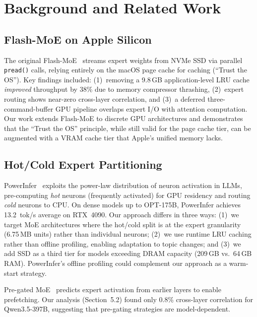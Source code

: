 \documentclass[11pt]{article}
\begin{document}
\section{Background and Related Work}

\subsection{Flash-MoE on Apple Silicon}

The original Flash-MoE~\cite{flashmoe} streams expert weights from NVMe SSD via parallel \texttt{pread()} calls, relying entirely on the macOS page cache for caching (``Trust the OS''). Key findings included: (1)~removing a 9.8\,GB application-level LRU cache \emph{improved} throughput by 38\% due to memory compressor thrashing, (2)~expert routing shows near-zero cross-layer correlation, and (3)~a deferred three-command-buffer GPU pipeline overlaps expert I/O with attention computation. Our work extends Flash-MoE to discrete GPU architectures and demonstrates that the ``Trust the OS'' principle, while still valid for the page cache tier, can be augmented with a VRAM cache tier that Apple's unified memory lacks.

\subsection{Hot/Cold Expert Partitioning}

PowerInfer~\cite{powerinfer} exploits the power-law distribution of neuron activation in LLMs, pre-computing \emph{hot} neurons (frequently activated) for GPU residency and routing \emph{cold} neurons to CPU. On dense models up to OPT-175B, PowerInfer achieves 13.2~tok/s average on RTX~4090. Our approach differs in three ways: (1)~we target MoE architectures where the hot/cold split is at the expert granularity (6.75\,MB units) rather than individual neurons; (2)~we use runtime LRU caching rather than offline profiling, enabling adaptation to topic changes; and (3)~we add SSD as a third tier for models exceeding DRAM capacity (209\,GB vs.\ 64\,GB RAM). PowerInfer's offline profiling could complement our approach as a warm-start strategy.

Pre-gated MoE~\cite{pregated} predicts expert activation from earlier layers to enable prefetching. Our analysis (Section~5.2) found only 0.8\% cross-layer correlation for Qwen3.5-397B, suggesting that pre-gating strategies are model-dependent.
\end{document}
